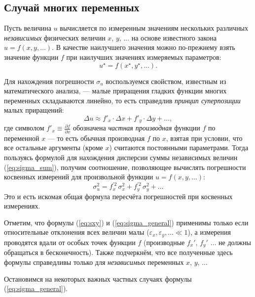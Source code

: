 

\subsection{Случай многих переменных}

Пусть величина $u$ вычисляется по измеренным значениям нескольких
различных \emph{независимых} физических величин $x$, $y$, $\ldots$
на основе известного закона $u=f\!\left(x,y,\ldots\right)$. В качестве
наилучшего значения можно по-прежнему взять значение функции $f$
при наилучших значениях измеряемых параметров:
\[
u^{\star}=f\!\left(x^{\star},y^{\star},\ldots\right).
\]

Для нахождения погрешности $\sigma_{u}$ воспользуемся свойством,
известным из математического анализа, --- малые приращения гладких
функции многих переменных складываются линейно, то есть справедлив
\emph{принцип суперпозиции} малых приращений:
\[
\Delta u\approx f'_{x}\cdot\Delta x+f'_{y}\cdot\Delta y+\ldots,
\]
где символом $f'_{x}\equiv\frac{\partial f}{\partial x}$ обозначена
\emph{частная производная} функции $f$ по переменной $x$ ---
то есть обычная производная $f$ по $x$, взятая при условии, что
все остальные аргументы (кроме $x$) считаются постоянными параметрами.
Тогда пользуясь формулой для нахождения дисперсии суммы независимых
величин (\ref{eq:sigma_sum}), получим соотношение, позволяющее вычислять
погрешности косвенных измерений для произвольной функции
$u=f\left(x,y,\ldots\right)$:
\begin{equation}
\boxed{\sigma_{u}^{2}=f_{x}^{\prime2}\,\sigma_{x}^{2}+f_{y}^{\prime2}\,\sigma_{y
}^{2}+\ldots}\label{eq:sigma_general}
\end{equation}
Это и есть искомая общая формула пересчёта погрешностей при косвенных
измерениях.

Отметим, что формулы (\ref{eq:sxy}) и (\ref{eq:sigma_general}) применимы
только если относительные отклонения всех величин малы
($\varepsilon_{x},\varepsilon_{y},\ldots\ll1$),
а измерения проводятся вдали от особых точек функции $f$ (производные
$f_{x}'$, $f_{y}'$ $\ldots$ не должны обращаться в бесконечность).
Также подчеркнём, что все полученные здесь формулы справедливы только
для \emph{независимых} переменных $x$, $y$, $\ldots$

Остановимся на некоторых важных частных случаях формулы
(\ref{eq:sigma_general}).


